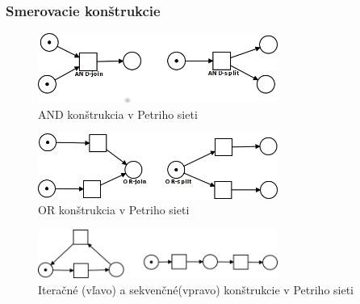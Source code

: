 \subsubsection{Smerovacie konštrukcie}
\begin{figure}[h]
	\centerline{\includegraphics[width=0.7\textwidth]{images/and}}
	\caption[and]{AND konštrukcia v Petriho sieti}
	\label{obr:cursus}
\end{figure}

\begin{figure}[h]
	\centerline{\includegraphics[width=0.7\textwidth]{images/or}}
	\caption[or]{OR konštrukcia v Petriho sieti}
	\label{obr:cursus}
\end{figure}

\begin{figure}[h]
	\centerline{\includegraphics[width=0.7\textwidth]{images/iteracia}}
	\caption[sekvencne a iteračné]{Iteračné (vľavo) a sekvenčné(vpravo) konštrukcie v Petriho sieti}
	\label{obr:cursus}
\end{figure}



